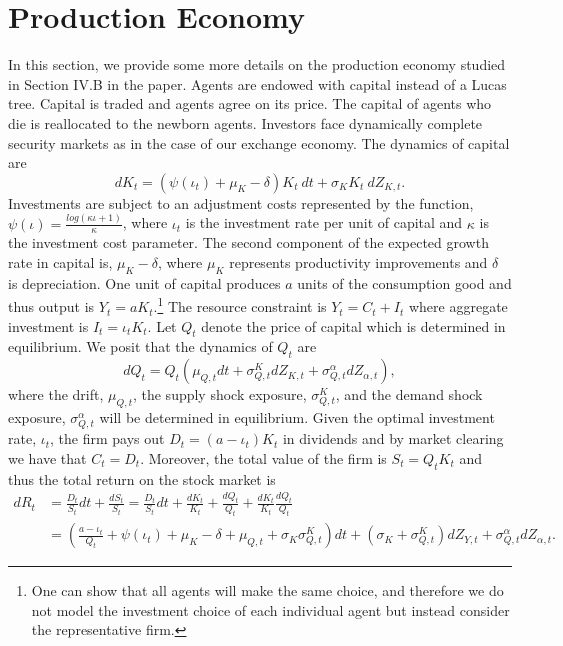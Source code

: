 \section{Production Economy}

In this section, we provide some more details on the production economy studied in Section IV.B in the paper. Agents are endowed with capital instead of a Lucas tree. Capital is traded and agents agree on its price. The capital of agents who die is reallocated to the newborn agents. Investors face dynamically complete security markets as in the case of our exchange economy. The dynamics of capital are
\begin{equation}
	dK_t = \left(\psi \left(\iota_t\right) + \mu_K-\delta\right)K_t \:  dt + \sigma_K K_t \: dZ_{K,t}.
\end{equation}
Investments are subject to an adjustment costs represented by the function, $\psi \left(\iota\right) = \frac{log\left(\kappa \iota + 1\right)}{\kappa}$, where $\iota_t$ is the investment rate per unit of capital and $\kappa$ is the investment cost parameter. The second component of the expected growth rate in capital is, $\mu_K-\delta$, where $\mu_K$ represents productivity improvements and $\delta$ is depreciation. One unit of capital produces $a$ units of the consumption good and thus output is $Y_t = a K_t$.\footnote{One can show that all agents will make the same choice, and therefore we do not model the investment choice of each individual agent but instead consider the representative firm.} The resource constraint is $Y_t = C_t + I_t$ where aggregate investment is $I_t=\iota_t K_t$. Let $Q_t$ denote the price of capital which is determined in equilibrium. We posit that the dynamics of $Q_t$ are
\begin{equation}
	dQ_t = Q_t\left(\mu_{Q,t} dt + \sigma^{K}_{Q,t} dZ_{K,t} + \sigma^{\alpha}_{Q,t} dZ_{\alpha,t} \right),
\end{equation}
where the drift, $\mu_{Q,t}$, the supply shock exposure, $\sigma^{K}_{Q,t}$, and the demand shock exposure, $\sigma^{\alpha}_{Q,t}$ will be determined in equilibrium. Given the optimal investment rate, $\iota_t$, the firm pays out $D_t = \left(a-\iota_t\right)K_t$ in dividends and by market clearing we have that $C_t = D_t$. Moreover, the total value of the firm is $S_t = Q_t K_t$ and thus the total return on the stock market is
{\small
\begin{align}
	dR_t &=  \frac{D_t}{S_t}dt + \frac{dS_t}{S_t} = \frac{D_t}{S_t}dt + \frac{dK_t}{K_t}  + \frac{dQ_t}{Q_t} + \frac{dK_t}{K_t} \frac{dQ_t}{Q_t} \nonumber \\
	        &=  \left(\frac{a-\iota_t}{Q_t} + \psi   \left(\iota_t\right)  + \mu_K-\delta + \mu_{Q,t} + \sigma_K \sigma^{K}_{Q,t}\right)dt  
	         + \left(\sigma_K+ \sigma^{K}_{Q,t}\right)dZ_{Y,t} + \sigma^{\alpha}_{Q,t}dZ_{\alpha,t}.
\end{align}
}
